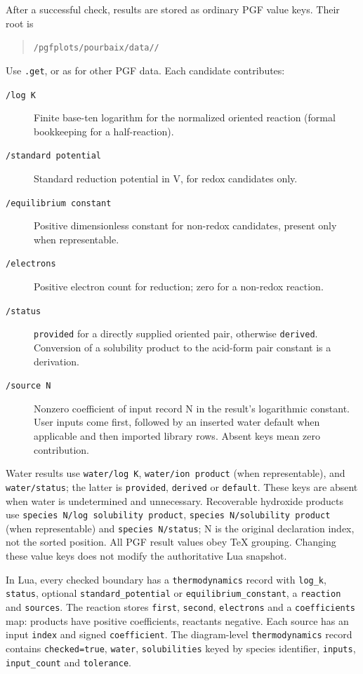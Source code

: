 \documentclass[a4paper,11pt]{ltxdoc}
\begin{document}
After a successful check, results are stored as ordinary PGF value keys.
Their root is
\begin{quote}
\texttt{/pgfplots/pourbaix/data/}\texttt{/}
\end{quote}
Use \texttt{.get}, \texttt{\string\pgfkeysgetvalue} or
\texttt{\string\pgfkeysvalueof} as for other PGF data. Each candidate contributes:
\begin{description}
  \item[\texttt{/log K}] Finite base-ten logarithm for the
    normalized oriented reaction (formal bookkeeping for a half-reaction).
  \item[\texttt{/standard potential}] Standard reduction potential
    in V, for redox candidates only.
  \item[\texttt{/equilibrium constant}] Positive dimensionless
    constant for non-redox candidates, present only when representable.
  \item[\texttt{/electrons}] Positive electron count for reduction;
    zero for a non-redox reaction.
  \item[\texttt{/status}] \texttt{provided} for a directly supplied
    oriented pair, otherwise \texttt{derived}. Conversion of a solubility product
    to the acid-form pair constant is a derivation.
  \item[\texttt{/source N}] Nonzero coefficient of input record N
    in the result's logarithmic constant. User inputs come first, followed by
    an inserted water default when applicable and then imported library rows.
    Absent keys mean zero contribution.
\end{description}
Water results use \texttt{water/log K}, \texttt{water/ion product} (when
representable), and \texttt{water/status}; the latter is
\texttt{provided}, \texttt{derived} or \texttt{default}. These keys are absent when
water is undetermined and unnecessary. Recoverable hydroxide products use
\texttt{species N/log solubility product}, \texttt{species N/solubility product}
(when representable) and \texttt{species N/status}; N is the original declaration
index, not the sorted position. All PGF result values obey TeX grouping.
Changing these value keys does not modify the authoritative Lua snapshot.

In Lua, every checked boundary has a \texttt{thermodynamics} record with
\texttt{log\_k}, \texttt{status}, optional \texttt{standard\_potential} or
\texttt{equilibrium\_constant}, a \texttt{reaction} and \texttt{sources}.
The reaction stores \texttt{first}, \texttt{second}, \texttt{electrons} and a
\texttt{coefficients} map: products have positive coefficients, reactants negative.
Each source has an input \texttt{index} and signed \texttt{coefficient}.
The diagram-level \texttt{thermodynamics} record contains \texttt{checked=true},
\texttt{water}, \texttt{solubilities} keyed by species identifier,
\texttt{inputs}, \texttt{input\_count} and \texttt{tolerance}.
\end{document}
